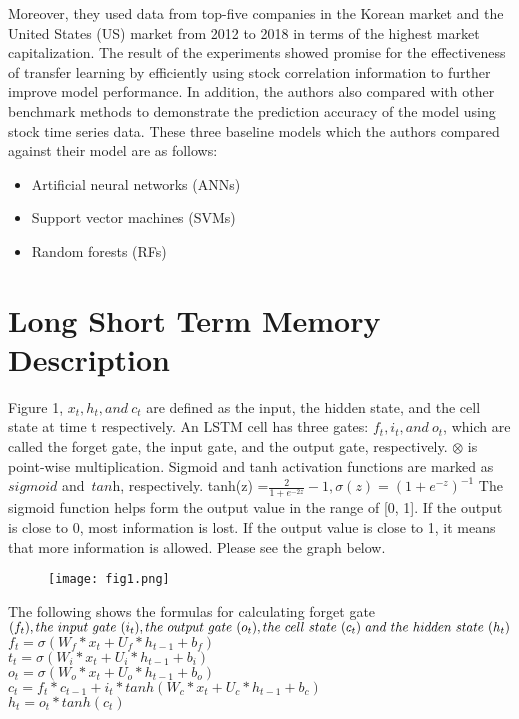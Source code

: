 \documentclass[11pt, oneside]{article}
\begin{document}
\begin{Large}
Moreover, they used data from top-five companies in the Korean market and the United States (US) market from 2012 to 2018 in terms of the highest market capitalization.  The result of the experiments showed promise for the effectiveness of transfer learning by efficiently using stock correlation information to further improve model performance.  In addition, the authors also compared with other benchmark methods to demonstrate the prediction accuracy of the model using stock time series data.  These three baseline models which the authors compared against their model are as follows:
\begin{itemize}

\item Artificial neural networks (ANNs)
\item Support vector machines (SVMs)
\item Random forests (RFs)
\end{itemize}
\section{Long Short Term Memory Description}
Figure 1,  $x_t, h_t, and\ c_t$ are defined as the input, the hidden state, and the cell state at time t respectively.  An LSTM cell has three gates: $f_t, i_t, and  \ o_t$, which are called the forget gate, the input gate, and the output gate, respectively. $\otimes$ is point-wise multiplication. Sigmoid and tanh activation functions are marked as
$\textit{sigmoid}$ and\ $\textit{tanh}$, respectively.  tanh(z) =$ \frac{2}{1+e^{-2z}}-1, \sigma(z)=(1+e^{-z})^{-1}$
The sigmoid function helps form the output value in the range of [0, 1]. If the output is close to 0, most information is lost.  If the output value is close to 1, it means that more information is allowed.   Please see the graph below.

\begin{figure}[h!]
  \texttt{[image: fig1.png]}
\end{figure}

The following shows the formulas for calculating forget gate\ $ (f_t), the\ input \ gate \ (i_t), \\
the \ output\ gate\ (o_t), the \ cell \ state \ (c_t) \ and \ the \ hidden\ state\ (h_t) $\\

$f_t=\sigma(W_f\ast x_t+U_f\ast h_{t-1}+b_f)$\\
$t_t=\sigma(W_i\ast x_t+U_i\ast h_{t-1}+b_i)$\\
$o_t=\sigma(W_o\ast x_t+U_o\ast h_{t-1}+b_o)$\\
$c_t=f_t\ast c_{t-1}+i_t \ast tanh(W_c \ast x_t+U_c \ast h_{t-1}+b_c)$\\
$h_t=o_t\ast tanh(c_t)$


\end{Large}
\end{document}
